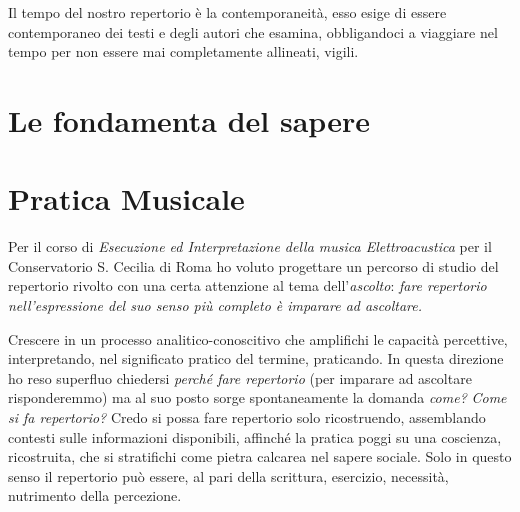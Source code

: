 \documentclass[
	a4paper,
	twocolumn
	]{article}
\begin{document}
Il tempo del nostro repertorio è la contemporaneità, esso esige di essere contemporaneo dei testi e degli autori che esamina, obbligandoci a viaggiare nel tempo per non essere mai completamente allineati, vigili.

\section{Le fondamenta del sapere}

\section{Pratica Musicale}

Per il corso di \emph{Esecuzione ed Interpretazione della musica Elettroacustica} per il Conservatorio S. Cecilia di Roma ho voluto progettare un percorso di studio del repertorio rivolto con una certa attenzione al tema dell'\emph{ascolto}: \emph{fare repertorio nell'espressione del suo senso pi\`u completo \`e imparare ad ascoltare.}

Crescere in un processo analitico-conoscitivo che amplifichi le capacità percettive, interpretando, nel significato pratico del termine, praticando. In questa direzione ho reso superfluo chiedersi \emph{perché fare repertorio} (per imparare ad ascoltare risponderemmo) ma al suo posto sorge spontaneamente la domanda \emph{come?} \emph{Come si fa repertorio?} Credo si possa fare repertorio solo ricostruendo, assemblando contesti sulle informazioni disponibili, affinch\'e la pratica poggi su una coscienza, ricostruita, che si stratifichi come pietra calcarea nel sapere sociale. Solo in questo senso il repertorio può essere, al pari della scrittura, esercizio, necessità, nutrimento della percezione.
\end{document}
